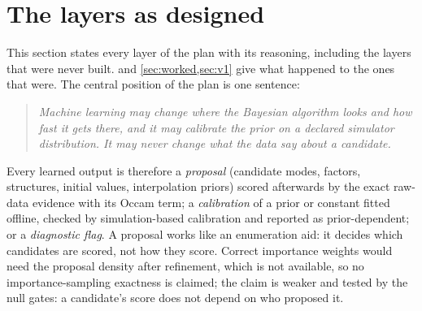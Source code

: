 \documentclass[11pt]{article}
\theoremstyle{plain}
\theoremstyle{definition}
\theoremstyle{remark}
\begin{document}


\section{The layers as designed}\label{sec:design}
This section states every layer of the plan with its reasoning, including the layers that were never built.  and \cref{sec:worked,sec:v1} give what happened to the ones that were.
The central position of the plan is one sentence:
\begin{quote}\emph{Machine learning may change where the Bayesian algorithm looks and how fast it gets there, and it may calibrate the prior on a declared simulator distribution. It may never change what the data say about a candidate.}\end{quote}
Every learned output is therefore a \emph{proposal} (candidate modes, factors, structures, initial values, interpolation priors) scored afterwards by the exact raw-data evidence with its Occam term; a \emph{calibration} of a prior or constant fitted offline, checked by simulation-based calibration and reported as prior-dependent; or a \emph{diagnostic flag}.
A proposal works like an enumeration aid: it decides which candidates are scored, not how they score. Correct importance weights would need the proposal density after refinement, which is not available, so no importance-sampling exactness is claimed; the claim is weaker and tested by the null gates: a candidate's score does not depend on who proposed it.
\end{document}

